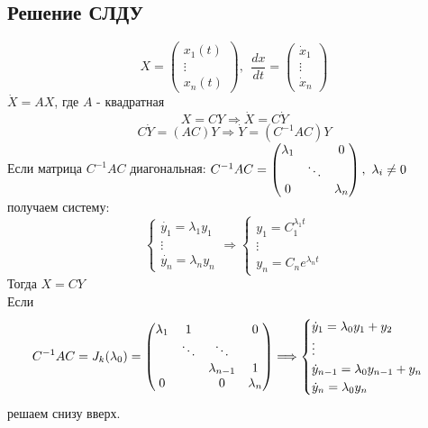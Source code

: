    \subsection{Решение СЛДУ}
    $$X = \begin{pmatrix}
        x_1(t)\\
        \vdots\\
        x_n(t)
    \end{pmatrix} , \ \ \frac{dx}{dt} = \begin{pmatrix}
        \dot{x}_1 \\
        \vdots\\
        \dot{x}_n
    \end{pmatrix}$$
    $\dot{X} = AX$, где $A$ - квадратная
    $$X = CY \Longrightarrow \dot{X} = C\dot{Y}$$
    $$C\dot{Y} = (AC)Y \Longrightarrow \dot{Y} = (C^{-1}AC)Y$$
    Если матрица $C^{-1}AC$ диагональная: $C^{-1}AC = \begin{pmatrix}
        \lambda_1 & \null & 0\\
        \null & \ddots & \\
        0 & \null & \lambda_n
    \end{pmatrix}, \ \lambda_i \neq 0$ получаем систему: 
    $$\begin{cases}
        \dot{y_1} = \lambda_1 y_1\\
        \vdots \\
        \dot{y_n} = \lambda_n y_n
    \end{cases} \Longrightarrow \begin{cases}
        y_1 = C_1^{\lambda_1t}\\
        \vdots \\
        y_n = C_ne^{\lambda_nt}
    \end{cases}$$
    Тогда $X = CY$\\
    Если $$C^{-1}AC = J_k(\lambda_0) = \begin{pmatrix}
        \lambda_1 & 1 & \null & 0 \\
        \null & \ddots & \ddots & \null \\
        \null & \null & \lambda_{n-1} & 1 \\
        0 & \null & 0 & \lambda_n
    \end{pmatrix} \Longrightarrow \begin{cases}
        \dot{y}_1 = \lambda_0y_1 + y_2\\
        \vdots \\
        \dot{y}_{n-1} = \lambda_0y_{n-1} + y_n\\
        \dot{y}_n = \lambda_0y_n
    \end{cases}$$
    решаем снизу вверх.
